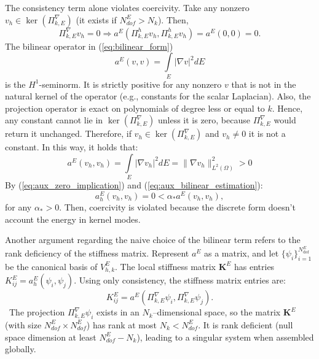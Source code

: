 \documentclass{article}
\begin{document}
The consistency term alone violates coercivity. Take any nonzero $v_h \in \ker (\Pi^\nabla_{k,E})$ (it exists if $N_{dof}^E > N_k$). Then, 
\begin{equation}\label{eq:aux_zero_implication}
    \Pi^\nabla_{k,E} v_h = 0 \Rightarrow a^E(\Pi^h_{k,E} v_h, \Pi^h_{k,E} v_h) = a^E(0, 0) = 0.
\end{equation}
The bilinear operator in (\ref{eq:bilinear_form})
\begin{equation}
    \nonumber
    a^E(v, v) = \int \limits_E |\nabla v |^2 dE
\end{equation}
is the $H^1$-seminorm. It is strictly positive for any nonzero $v$ that is not in the natural kernel of the operator (e.g., constants for the scalar Laplacian). Also, the projection operator is exact on polynomials of degree less or equal to $k$. Hence, any constant cannot lie in $\ker (\Pi^\nabla_{k,E})$ unless it is zero, because $\Pi^\nabla_{k,E}$ would return it unchanged. Therefore, if $v_h \in \ker (\Pi^\nabla_{k,E})$ and $v_h \neq 0$ it is not a constant. In this way, it holds that:
\begin{equation}\label{eq:aux_bilinear_estimation}
    a^E(v_h, v_h) = \int \limits_E |\nabla v_h |^2 dE = \| \nabla v_h \|^2_{L^2(\Omega)} > 0
\end{equation}
By (\ref{eq:aux_zero_implication}) and (\ref{eq:aux_bilinear_estimation}):
\begin{equation}
    \nonumber
    a^E_h(v_h, v_h) = 0 < \alpha_* a^E(v_h, v_h),
\end{equation}
for any $\alpha_* > 0$. Then, coercivity is violated because the discrete form doesn't account the energy in kernel modes.

Another argument regarding the naive choice of the bilinear term refers to the rank deficiency of the stiffness matrix. Represent $a^E$ as a matrix, and let $\{ \psi _i \}^{N^E_{\text{dof}}}_{i=1}$ be the canonical basis of $V^E_{h,k}$. The local stiffness matrix $\mathbf{K}^E$ has entries $K^E_{ij} = a^E_h(\psi _i, \psi _j)$. Using only consistency, the stiffness matrix entries are:
\begin{equation}
    \nonumber
    K^E_{ij} = a^E(\Pi^\nabla_{k,E} \psi_i, \Pi^\nabla_{k,E}  \psi_j).
\end{equation}\
The projection $\Pi^\nabla_{k,E}\psi _i$ exists in an $N_k$--dimensional space, so the matrix $\mathbf{K}^E$ (with size $N_{dof}^E \times N_{dof}^E$) has rank at most $N_k < N_{dof}^E$. It is rank deficient (null space dimension at least $N_{dof}^E - N_k$), leading to a singular system when assembled globally.
\end{document}
